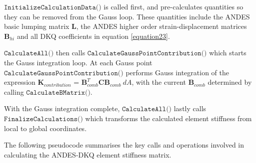 $\texttt{InitializeCalculationData()}$ is called first, and pre-calculates quantities so they can be removed from the Gauss loop. These quantities include the ANDES basic lumping matrix $\textbf{L}$, the ANDES higher order strain-displacement matrices $\textbf{B}_{hi}$ and all DKQ coefficients in equation  \eqref{equation23}.

$\texttt{CalculateAll()}$ then calls $\texttt{CalculateGaussPointContribution()}$ which starts the Gauss integration loop. At each Gauss point $\texttt{CalculateGaussPointContribution()}$ performs Gauss integration of the expression $\textbf{K}_{contribution}$ = $\textbf{B}_{comb}^T \textbf{C} \textbf{B}_{comb}\  dA$, with the current $\textbf{B}_{comb}$ determined by calling $\texttt{CalculateBMatrix()}$.

With the Gauss integration complete, $\texttt{CalculateAll()}$ lastly calls $\texttt{FinalizeCalculations()}$ which transforms the calculated element stiffness from local to global coordinates.

The following pseudocode summarises the key calls and operations involved in calculating the ANDES-DKQ element stiffness matrix.

